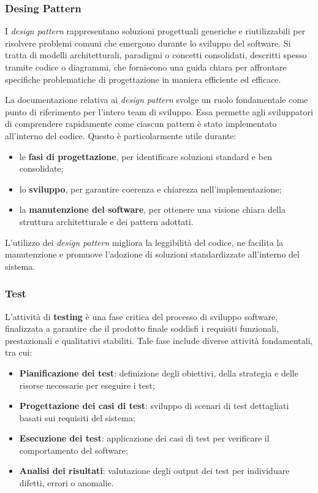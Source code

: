 \subsubsection{Desing Pattern}
I \textit{design pattern} rappresentano soluzioni progettuali generiche e riutilizzabili per risolvere problemi comuni che emergono durante lo sviluppo del software. Si tratta di modelli architetturali, paradigmi o concetti consolidati, descritti spesso tramite codice o diagrammi, che forniscono una guida chiara per affrontare specifiche problematiche di progettazione in maniera efficiente ed efficace.

La documentazione relativa ai \textit{design pattern} svolge un ruolo fondamentale come punto di riferimento per l'intero team di sviluppo. Essa permette agli sviluppatori di comprendere rapidamente come ciascun pattern è stato implementato all'interno del codice. Questo è particolarmente utile durante:
\begin{itemize}
    \item le \textbf{fasi di progettazione}, per identificare soluzioni standard e ben consolidate;
    \item lo \textbf{sviluppo}, per garantire coerenza e chiarezza nell'implementazione;
    \item la \textbf{manutenzione del software}, per ottenere una visione chiara della struttura architetturale e dei pattern adottati.
\end{itemize}
L'utilizzo dei \textit{design pattern} migliora la leggibilità del codice, ne facilita la manutenzione e promuove l'adozione di soluzioni standardizzate all'interno del sistema.

\subsubsection{Test}
L'attività di \textbf{testing} è una fase critica del processo di sviluppo software, finalizzata a garantire che il prodotto finale soddisfi i requisiti funzionali, prestazionali e qualitativi stabiliti. Tale fase include diverse attività fondamentali, tra cui:
\begin{itemize}
    \item \textbf{Pianificazione dei test}: definizione degli obiettivi, della strategia e delle risorse necessarie per eseguire i test;
    \item \textbf{Progettazione dei casi di test}: sviluppo di scenari di test dettagliati basati sui requisiti del sistema;
    \item \textbf{Esecuzione dei test}: applicazione dei casi di test per verificare il comportamento del software;
    \item \textbf{Analisi dei risultati}: valutazione degli output dei test per individuare difetti, errori o anomalie.
\end{itemize}

